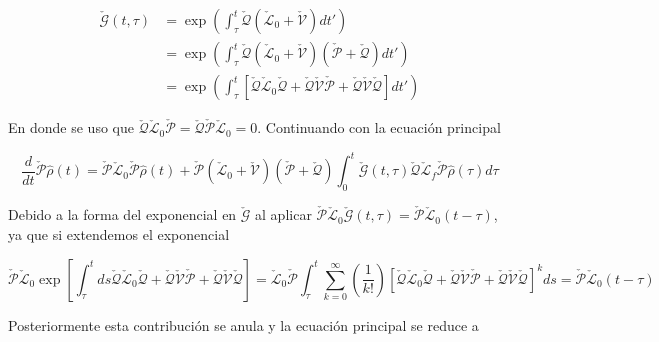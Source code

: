 \begin{appendixs}
\begin{align*}
    \check{\mathcal{G}}(t,\tau) & = \exp\left(  \int_{\tau}^{t}\check{\mathcal{Q}}(\check{\mathcal{L}}_{0} + \check{\mathcal{V}})dt' \right) \\
        & = \exp\left(  \int_{\tau}^{t}\check{\mathcal{Q}}(\check{\mathcal{L}}_{0}+\check{\mathcal{V}})(\check{\mathcal{P}}+\check{\mathcal{Q}}) dt' \right) \\
            & = \exp\left(  \int_{\tau}^{t}\left[\check{\mathcal{Q}}\check{\mathcal{L}}_{0}\check{\mathcal{Q}}+ \check{\mathcal{Q}}\check{\mathcal{V}}\check{\mathcal{P}}+\check{\mathcal{Q}}\check{\mathcal{V}}\check{\mathcal{Q}}\right] dt' \right)       
\end{align*}

En donde se uso que $\check{\mathcal{Q}}\check{\mathcal{L}}_{0}\check{\mathcal{P}} = \check{\mathcal{Q}}\check{\mathcal{P}}\check{\mathcal{L}}_{0}=0$. Continuando con la ecuación principal

\begin{equation*}
    \frac{d}{dt}\check{\mathcal{P}}\hat{\rho}(t) = \check{\mathcal{P}}\check{\mathcal{L}}_{0}\check{\mathcal{P}}\hat{\rho}(t) + \check{\mathcal{P}}(\check{\mathcal{L}}_{0} + \check{\mathcal{V}})(\check{\mathcal{P}}+\check{\mathcal{Q}})\int_{0}^{t}\check{\mathcal{G}}(t,\tau)\check{\mathcal{Q}}\check{\mathcal{L}}_{f} \check{\mathcal{P}}\hat{\rho}(\tau)d\tau        
\end{equation*}

Debido a la forma del exponencial en $\check{\mathcal{G}}$ al aplicar $\check{\mathcal{P}}\check{\mathcal{L}}_{0}\check{\mathcal{G}}(t,\tau)= \check{\mathcal{P}}\check{\mathcal{L}}_{0}(t-\tau)$, ya que si extendemos el exponencial

\begin{equation*}
    \check{\mathcal{P}}\check{\mathcal{L}}_{0}\exp\left[\int_{\tau}^{t}ds\check{\mathcal{Q}}\check{\mathcal{L}}_{0}\check{\mathcal{Q}}+ \check{\mathcal{Q}}\check{\mathcal{V}}\check{\mathcal{P}}+\check{\mathcal{Q}}\check{\mathcal{V}}\check{\mathcal{Q}} \right] = \check{\mathcal{L}}_{0}\check{\mathcal{P}}\int_{\tau}^{t}\sum_{k=0}^{\infty}\left(\frac{1}{k!} \right)\left[\check{\mathcal{Q}}\check{\mathcal{L}}_{0}\check{\mathcal{Q}}+ \check{\mathcal{Q}}\check{\mathcal{V}}\check{\mathcal{P}}+\check{\mathcal{Q}}\check{\mathcal{V}}\check{\mathcal{Q}} \right]^{k}ds = \check{\mathcal{P}}\check{\mathcal{L}}_{0}(t-\tau) 
\end{equation*}

Posteriormente esta contribución se anula y la ecuación principal se reduce a


\end{appendixs}
